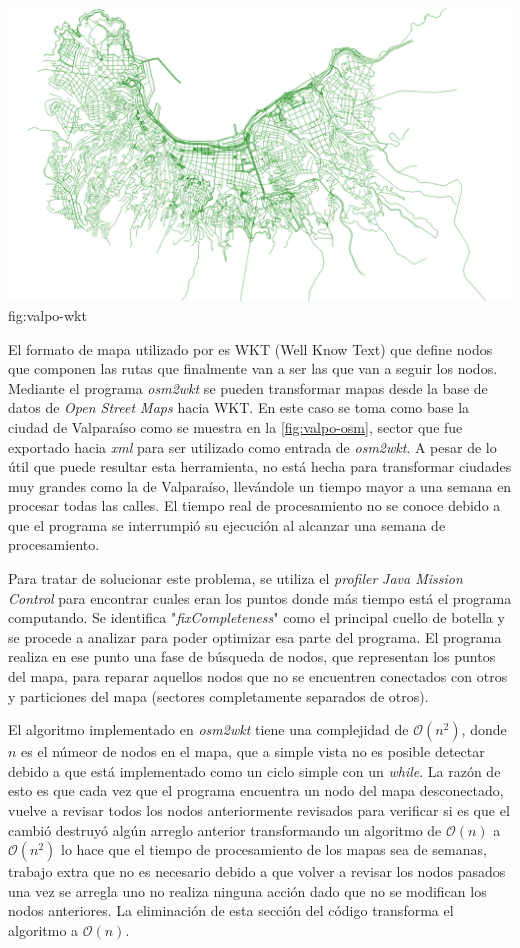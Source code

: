 {\includegraphics[scale=0.5]{imagenes/valpo/solo_transformado.png}}{fig:valpo-wkt}

El formato de mapa utilizado por \theone{} es WKT (Well Know Text) que define
nodos que componen las rutas que finalmente van a ser las que van a seguir los
nodos. Mediante el programa \textit{osm2wkt} \cite{osm2wkt} se pueden
transformar mapas desde la base de datos de \textit{Open Street Maps} hacia WKT.
En este caso se toma como base la ciudad de Valparaíso como se muestra en la
\ref{fig:valpo-osm}, sector que fue exportado hacia \textit{xml} para ser
utilizado como entrada de \textit{osm2wkt}.  A pesar de lo útil que puede
resultar esta herramienta, no está hecha para transformar ciudades muy grandes
como la de Valparaíso, llevándole un tiempo mayor a una semana en procesar
todas las calles. El tiempo real de procesamiento no se conoce debido a que el
programa se interrumpió su ejecución al alcanzar una semana de procesamiento.

Para tratar de solucionar este problema, se utiliza el \textit{profiler}
\textit{Java Mission Control} \cite{java_mission_control} para encontrar cuales
eran los puntos donde más tiempo está el programa computando. Se identifica
"\textit{fixCompleteness}" como el principal cuello de botella y se procede a
analizar para poder optimizar esa parte del programa. El programa realiza en ese
punto una fase de búsqueda de nodos, que representan los puntos del mapa, para
reparar aquellos nodos que no se encuentren conectados con otros y particiones
del mapa (sectores completamente separados de otros).

El algoritmo implementado en \textit{osm2wkt} tiene una complejidad de
$\mathcal{O}(n^2)$, donde $n$ es el númeor de nodos en el mapa, que a simple
vista no es posible detectar debido a que está implementado como un ciclo simple
con un \textit{while}. La razón de esto es que cada vez que el programa
encuentra un nodo del mapa desconectado, vuelve a revisar todos los nodos
anteriormente revisados para verificar si es que el cambió destruyó algún
arreglo anterior transformando un algoritmo de $\mathcal{O}(n)$ a
$\mathcal{O}(n^2)$ lo hace que el tiempo de procesamiento de los mapas sea de
semanas, trabajo extra que no es necesario debido a que volver a revisar los
nodos pasados una vez se arregla uno no realiza ninguna acción dado que no se
modifican los nodos anteriores. La eliminación de esta sección del código
transforma el algoritmo a $\mathcal{O}(n)$.

